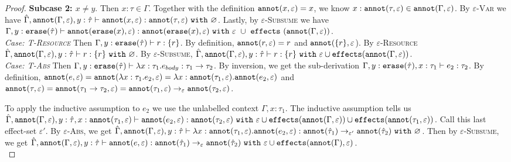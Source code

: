\begin{appendix}
\begin{proof}
\textbf{Subcase 2: $x \neq y$}. Then $x: \tau \in \Gamma$. Together with the definition $\mathtt{annot}(x, \varepsilon) = x$, we know $x: \mathtt{annot}(\tau, \varepsilon) \in \mathtt{annot}(\Gamma, \varepsilon)$. By \textsc{$\varepsilon$-Var} we have $\hat \Gamma, \mathtt{annot}(\Gamma, \varepsilon), y: \hat \tau \vdash \mathtt{annot}(x, \varepsilon): \mathtt{annot}(\tau, \varepsilon)~\mathtt{with}~ \varnothing$. Lastly, by \textsc{$\varepsilon$-Subsume} we have $\Gamma, y: \mathtt{erase}(\hat \tau) \vdash \mathtt{annot}(\mathtt{erase}(x), \varepsilon): \mathtt{annot}(\mathtt{erase}(x), \varepsilon)~\mathtt{with}~ \varepsilon~\cup~\mathtt{effects}~(\mathtt{annot}(\Gamma, \varepsilon))$.\\

\textit{Case: \textsc{T-Resource}} Then $\Gamma, y: \mathtt{erase}(\hat \tau) \vdash r : \{ r \}$. By definition, $\mathtt{annot}(r, \varepsilon) = r$ and $\mathtt{annot}(\{ r \}, \varepsilon$). By \textsc{$\varepsilon$-Resource}  $\hat \Gamma, \mathtt{annot}(\Gamma, \varepsilon), y: \hat \tau \vdash r: \{ r \}~\mathtt{with}~ \varnothing$. By \textsc{$\varepsilon$-Subsume}, $\hat \Gamma, \mathtt{annot}(\Gamma, \varepsilon), y: \hat \tau \vdash r: \{ r \}~\mathtt{with}~ \varepsilon \cup \mathtt{effects}(\mathtt{annot}(\Gamma, \varepsilon))$.\\

\textit{Case: \textsc{T-Abs}} Then $\Gamma, y: \mathtt{erase}(\hat \tau) \vdash \lambda x: \tau_1.e_{body} : \tau_1 \rightarrow \tau_2$. By inversion, we get the sub-derivation $\Gamma, y: \mathtt{erase}(\hat \tau), x:\tau_1  \vdash e_2: \tau_2$. By definition, $\mathtt{annot}(e, \varepsilon) = \mathtt{annot}(\lambda x: \tau_1.e_2, \varepsilon) = \lambda x: \mathtt{annot}(\tau_1, \varepsilon).\mathtt{annot}(e_2, \varepsilon)$ and $\mathtt{annot}(\tau, \varepsilon) = \mathtt{annot}(\tau_1 \rightarrow \tau_2, \varepsilon) = \mathtt{annot}(\tau_1, \varepsilon) \rightarrow_{\varepsilon} \mathtt{annot}(\tau_2, \varepsilon)$. 

To apply the inductive assumption to $e_2$ we use the unlabelled context $\Gamma, x: \tau_1$. The inductive assumption tells us $\hat \Gamma, \mathtt{annot}(\Gamma, \varepsilon), y: \hat \tau, x: \mathtt{annot}(\tau_1, \varepsilon) \vdash \mathtt{annot}(e_2, \varepsilon): \mathtt{annot}(\tau_2, \varepsilon)~\mathtt{with}~ \varepsilon \cup \mathtt{effects}(\mathtt{annot}(\Gamma, \varepsilon)) \cup \mathtt{effects}(\mathtt{annot}(\tau_1, \varepsilon))$. Call this last effect-set $\varepsilon'$. By \textsc{$\varepsilon$-Abs}, we get $\hat \Gamma, \mathtt{annot}(\Gamma, \varepsilon), y: \hat \tau \vdash \lambda x: \mathtt{annot}(\tau_1, \varepsilon) . \mathtt{annot}(e_2, \varepsilon) : \mathtt{annot}(\hat \tau_1) \rightarrow_{\varepsilon'} \mathtt{annot}(\hat \tau_2)~\mathtt{with}~ \varnothing$. Then by \textsc{$\varepsilon$-Subsume}, we get $\hat \Gamma, \mathtt{annot}(\Gamma, \varepsilon), y: \hat \tau \vdash \mathtt{annot}(e, \varepsilon) : \mathtt{annot}(\hat \tau_1) \rightarrow_{\varepsilon} \mathtt{annot}(\hat \tau_2)~\mathtt{with}~ \varepsilon \cup \mathtt{effects}(\mathtt{annot}(\Gamma), \varepsilon) $.\\


\end{proof}
\end{appendix}
